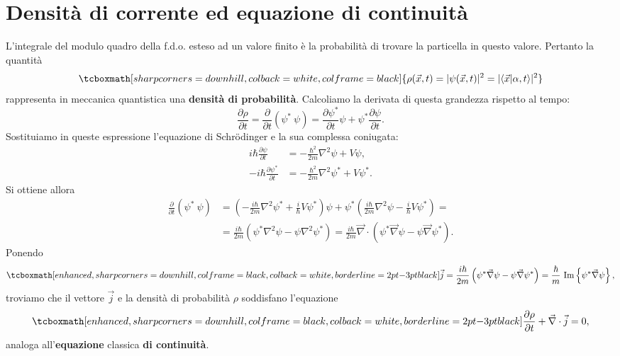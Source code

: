 \documentclass[a4paper,12pt,oneside]{book}
\begin{document}
\section[Densità di corrente ed equazione di continuità]{Densità di corrente ed equazione di continuità}
L'integrale del modulo quadro della f.d.o. esteso ad un valore finito è la probabilità di trovare la particella in questo valore. Pertanto la quantità
	\begin{equation}
		\tcboxmath[sharp corners=downhill, colback=white, colframe=black]{
			\rho (\vec{x}, t) = \vert \psi (\vec{x},t) \vert ^2 = \vert \langle \vec{x}\vert \alpha, t \rangle \vert ^2
				}
	\end{equation}
rappresenta in meccanica quantistica una \textbf{densità di probabilità}. Calcoliamo la derivata di questa grandezza rispetto al tempo:
	\begin{equation}
		\frac{\partial \rho}{\partial t} = \frac{\partial }{\partial t}\left( \psi^*\ \psi \right) = \frac{\partial \psi ^*}{\partial t}\psi + \psi^*\frac{\partial \psi}{\partial t}.
	\end{equation}
Sostituiamo in queste espressione l'equazione di Schr\"{o}dinger e la sua complessa coniugata:
	\begin{align}
	 	i\hbar \frac{\partial \psi}{\partial t} &= -\frac{\hbar ^2}{2m} \nabla ^ 2 \psi + V \psi ,\\[0.5cm]
		 -i\hbar \frac{\partial \psi ^*}{\partial t} &= -\frac{\hbar ^2}{2m} \nabla ^ 2 \psi ^* + V \psi ^* .
	\end{align}
Si ottiene allora
	\begin{align}
		\frac{\partial }{\partial t}\left(\psi^*\ \psi \right) & =  \left(-\frac{i\hbar}{2m}\nabla ^2 \psi ^* +\frac{i}{\hbar}V\psi ^*\right)\psi +  \psi ^* \left(\frac{i\hbar}{2m}\nabla ^2 \psi -\frac{i}{\hbar}V\psi ^*\right)= \nonumber\\[0.3cm]
		&=  \frac{i\hbar}{2m}\left(\psi ^* \nabla ^2 \psi - \psi \nabla ^2 \psi ^* \right) =  \frac{i\hbar}{2m} \vec{\nabla}\cdot \left(\psi ^* \vec{\nabla} \psi - \psi \vec{\nabla} \psi ^* \right). 
	\end{align}
Ponendo
	\begin{equation}
		\tcboxmath[enhanced, sharp corners=downhill, colframe=black, colback=white, borderline={2pt}{-3pt}{black}]{
			\vec{j}=\frac{i\hbar}{2m} \left(\psi ^* \vec{\nabla} \psi - \psi \vec{\nabla} \psi ^* \right)= \frac{\hbar}{m}\ \textrm{Im}\left\{\psi ^* \vec{\nabla}\psi \right\},
			}
	\end{equation}
troviamo che il vettore $\vec{j}$ e la densità di probabilità $\rho$ soddisfano l'equazione
	\begin{equation}
		\tcboxmath[enhanced, sharp corners=downhill, colframe=black, colback=white, borderline={2pt}{-3pt}{black}]{
			\frac{\partial \rho}{\partial t}+ \vec{\nabla}\cdot\vec{j}=0,
				}
	\end{equation}
analoga all'\textbf{equazione} classica \textbf{di continuità}.\\
\end{document}
